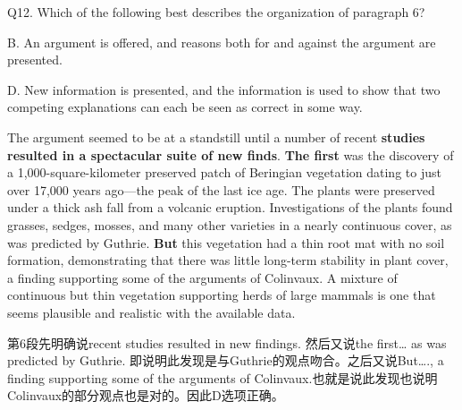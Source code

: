 \begin{blk}
    \begin{qst}
        Q12. Which of the following best describes the organization of paragraph 6?
    \end{qst}

    \begin{chc}
        B. An argument is offered, and reasons both for and against the argument are presented.

        D. New information is presented, and the information is used to show that two competing explanations can each be seen as correct in some way.
    \end{chc}

    \begin{psgq}
        The argument seemed to be at a standstill until a number of recent \textbf{studies resulted in a spectacular suite of new finds}. \textbf{The first} was the discovery of a 1,000-square-kilometer preserved patch of Beringian vegetation dating to just over 17,000 years ago—the peak of the last ice age. The plants were preserved under a thick ash fall from a volcanic eruption. Investigations of the plants found grasses, sedges, mosses, and many other varieties in a nearly continuous cover, as was predicted by Guthrie. \textbf{But} this vegetation had a thin root mat with no soil formation, demonstrating that there was little long-term stability in plant cover, a finding supporting some of the arguments of Colinvaux. A mixture of continuous but thin vegetation supporting herds of large mammals is one that seems plausible and realistic with the available data.
    \end{psgq}

    \begin{nlz}
        第6段先明确说recent studies resulted in new findings. 然后又说the first… as was predicted by Guthrie. 即说明此发现是与Guthrie的观点吻合。之后又说But…., a finding supporting some of the arguments of Colinvaux.也就是说此发现也说明Colinvaux的部分观点也是对的。因此D选项正确。
    \end{nlz}
\end{blk}

